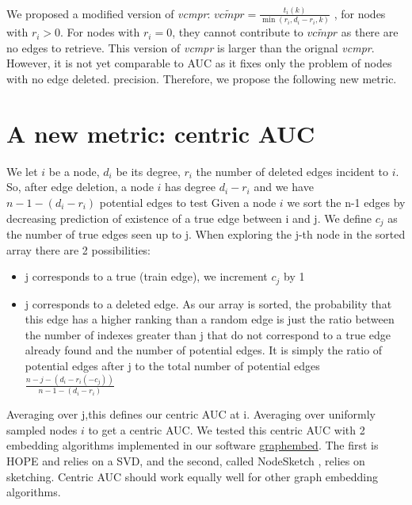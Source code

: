 \documentclass{article}
\begin{document}
\paragraph{}

We proposed a modified version of \textit{vcmpr}: $ \widetilde{vcmpr} = \frac{t_{i}(k)}{\min(r_{i}, d_{i} - r_{i}, k)}$ , for nodes with $ r_{i} > 0 $. For nodes with $ r_{i} = 0 $, they cannot contribute to $\widetilde{vcmpr}$  as there are no edges to retrieve.
This version of \textit{vcmpr} is larger than the orignal \textit{vcmpr}. However, it is not yet comparable to AUC as it fixes only the problem of nodes with no edge deleted.
precision. Therefore, we propose the following new metric.

\section{A new metric: centric AUC}
We let $i$ be a node, $d_{i}$ be its degree, $r_{i}$ the number of deleted edges incident to $i$.
So, after edge deletion, a node $i$ has degree $d_{i} - r_{i}$ and we have  $ n - 1 - (d_{i} - r_{i})$  potential edges to test
Given a node $i$ we sort the n-1 edges by decreasing prediction of existence of a true edge between i and j.
We define $c_{j}$  as the number of true edges seen up to j.
When exploring the j-th node in the sorted array there are 2 possibilities:
\begin{itemize}
    \item j corresponds to a true (train edge), we increment $c_{j}$ by 1
    \item j corresponds to a deleted edge. As our array is sorted, the probability that this edge has a higher
          ranking than a random edge is just the ratio between the number of indexes greater than j that do not correspond
          to a true edge already found and the number of potential edges. It is simply the ratio of potential edges after j to
          the total number of potential edges $ \frac{n-j-(d_{i}-r_{i}(-c_{j}))}{n-1-(d_{i}-r_{i})}$
\end{itemize}
Averaging over j,this defines our centric AUC at i.  Averaging over uniformly sampled nodes $i$ to get a centric AUC.
We tested this centric AUC with 2 embedding algorithms implemented in our software \href{https://github.com/jean-pierreBoth/graphembed}{\color{blue}graphembed}.
The first is HOPE \citep{Cui} and relies on a SVD, and the second, called NodeSketch \citep{Yang}, relies on sketching. Centric AUC should work equally well for other graph embedding algorithms.
\end{document}

